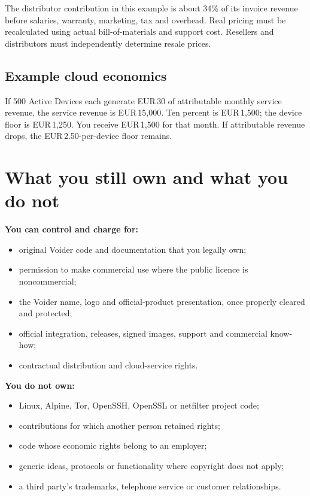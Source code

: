 \documentclass[11pt,a4paper]{article}
\newcommand{\money}{EUR\,}
\begin{document}
The distributor contribution in this example is about 34\% of its invoice revenue before salaries, warranty, marketing, tax and overhead. Real pricing must be recalculated using actual bill-of-materials and support cost. Resellers and distributors must independently determine resale prices.

\subsection*{Example cloud economics}

If 500 Active Devices each generate \money30 of attributable monthly service revenue, the service revenue is \money15,000. Ten percent is \money1,500; the device floor is \money1,250. You receive \money1,500 for that month. If attributable revenue drops, the \money2.50-per-device floor remains.

\newpage
\section*{What you still own and what you do not}

\textbf{You can control and charge for:}
\begin{itemize}
  \item original Voider code and documentation that you legally own;
  \item permission to make commercial use where the public licence is noncommercial;
  \item the Voider name, logo and official-product presentation, once properly cleared and protected;
  \item official integration, releases, signed images, support and commercial know-how;
  \item contractual distribution and cloud-service rights.
\end{itemize}

\textbf{You do not own:}
\begin{itemize}
  \item Linux, Alpine, Tor, OpenSSH, OpenSSL or netfilter project code;
  \item contributions for which another person retained rights;
  \item code whose economic rights belong to an employer;
  \item generic ideas, protocols or functionality where copyright does not apply;
  \item a third party's trademarks, telephone service or customer relationships.
\end{itemize}
\end{document}
